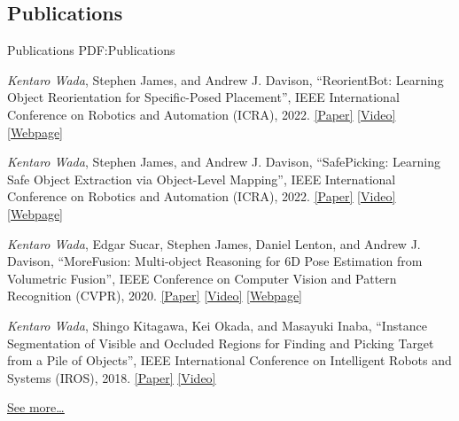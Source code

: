 \documentclass[letterpaper,MMMyyyy,nonstop]{simpleresumecv}
\begin{document}
\begin{body}

\section
{Publications}
{Publications}
{PDF:Publications}

\BulletItem
\textit{Kentaro Wada}, Stephen James, and Andrew J. Davison,
``ReorientBot: Learning Object Reorientation for Specific-Posed Placement'',
IEEE International Conference on Robotics and Automation (ICRA), 2022.
\href{https://arxiv.org/abs/2202.11092}{\underline{[Paper]}}
\href{https://youtu.be/ahWN84sWWJU}{\underline{[Video]}}
\href{https://reorientbot.wkentaro.com}{\underline{[Webpage]}}

\BulletItem
\textit{Kentaro Wada}, Stephen James, and Andrew J. Davison,
``SafePicking: Learning Safe Object Extraction via Object-Level Mapping'',
IEEE International Conference on Robotics and Automation (ICRA), 2022.
\href{https://arxiv.org/abs/2202.05832}{\underline{[Paper]}}
\href{https://youtu.be/ejjqiBqRRKo}{\underline{[Video]}}
\href{https://safepicking.wkentaro.com}{\underline{[Webpage]}}

\BulletItem
\textit{Kentaro Wada}, Edgar Sucar, Stephen James, Daniel Lenton, and Andrew J.
Davison,
``MoreFusion: Multi-object Reasoning for 6D Pose Estimation from Volumetric
Fusion'',
IEEE Conference on Computer Vision and Pattern Recognition (CVPR), 2020.
\href{https://arxiv.org/abs/2004.04336}{\underline{[Paper]}}
\href{https://youtu.be/6oLUhuZL4ko}{\underline{[Video]}}
\href{https://morefusion.wkentaro.com}{\underline{[Webpage]}}

\BulletItem
\textit{Kentaro Wada}, Shingo Kitagawa, Kei Okada, and Masayuki Inaba,
``Instance Segmentation of Visible and Occluded Regions for Finding and Picking Target from a Pile of Objects'',
IEEE International Conference on Intelligent Robots and Systems (IROS), 2018.
\href{https://arxiv.org/abs/2001.07475}{\underline{[Paper]}}
\href{https://youtu.be/tNLtXb04i3w}{\underline{[Video]}}

\hfill
\href{https://scholar.google.com/citations?user=JoeSwcoAAAAJ&hl=ja}{\underline{See more…}}




\end{body}
\end{document}
